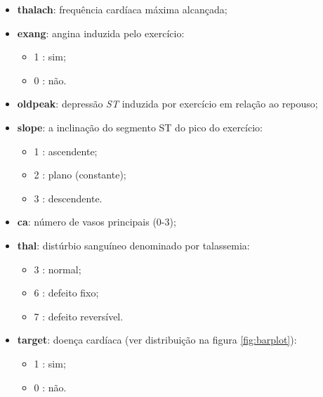 \documentclass[a4paper]{report}
\begin{document}
{\begin{itemize}
\begin{itemize}
		\end{itemize}
	    \item \textbf{thalach}: frequência cardíaca máxima alcançada;
		\item \textbf{exang}: angina induzida pelo exercício:
		\begin{itemize}
			\item 1 : sim;
			\item 0 : não.
		\end{itemize}
	    \item \textbf{oldpeak}: depressão \textit{ST} induzida por exercício em relação ao repouso;
	    \item \textbf{slope}: a inclinação do segmento ST do pico do exercício:
	    \begin{itemize}
			\item 1 : ascendente;
			\item 2 : plano (constante);
			\item 3 : descendente.
		\end{itemize}
	    \item \textbf{ca}: número de vasos principais (0-3);
		\item \textbf{thal}: distúrbio sanguíneo denominado por talassemia:
		\begin{itemize}
			\item 3 : normal;
			\item 6 : defeito fixo;
			\item 7 : defeito reversível.
		\end{itemize}
	    \item \textbf{target}: doença cardíaca (ver distribuição na figura \ref{fig:barplot}):
	    \begin{itemize}
			\item 1 : sim;
			\item 0 : não.
		\end{itemize}


\end{itemize}}
\end{document}
